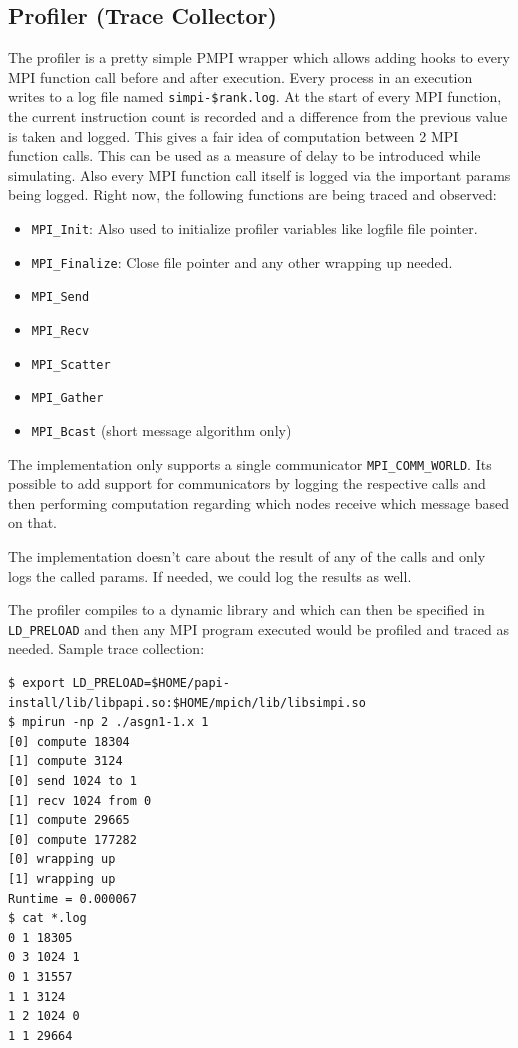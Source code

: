 \documentclass[10pt,conference]{IEEEtran}
\begin{document}
\subsection{Profiler (Trace Collector)}
The profiler is a pretty simple PMPI wrapper which allows adding hooks to every
MPI function call before and after execution. Every process in an execution
writes to a log file named \texttt{simpi-\$rank.log}. At the start of every MPI
function, the current instruction count is recorded and a difference from the
previous value is taken and logged. This gives a fair idea of computation
between 2 MPI function calls. This can be used as a measure of delay to be
introduced while simulating. Also every MPI function call itself is logged via
the important params being logged. Right now, the following functions are being
traced and observed:
\begin{itemize}
  \item \texttt{MPI\_Init}: Also used to initialize profiler variables like
    logfile file pointer.
  \item \texttt{MPI\_Finalize}: Close file pointer and any other wrapping up
    needed.
  \item \texttt{MPI\_Send}
  \item \texttt{MPI\_Recv}
  \item \texttt{MPI\_Scatter}
  \item \texttt{MPI\_Gather}
  \item \texttt{MPI\_Bcast} (short message algorithm only)
\end{itemize}

The implementation only supports a single communicator
\texttt{MPI\_COMM\_WORLD}. Its possible to add support for communicators by
logging the respective calls and then performing computation regarding which
nodes receive which message based on that.

The implementation doesn't care about the result of any of the calls and only
logs the called params. If needed, we could log the results as well.

The profiler compiles to a dynamic library and which can then be specified in
\texttt{LD\_PRELOAD} and then any MPI program executed would be profiled and
traced as needed. Sample trace collection:
\begin{lstlisting}[frame=single]
$ export LD_PRELOAD=$HOME/papi-install/lib/libpapi.so:$HOME/mpich/lib/libsimpi.so
$ mpirun -np 2 ./asgn1-1.x 1
[0] compute 18304
[1] compute 3124
[0] send 1024 to 1
[1] recv 1024 from 0
[1] compute 29665
[0] compute 177282
[0] wrapping up
[1] wrapping up
Runtime = 0.000067
$ cat *.log
0 1 18305
0 3 1024 1
0 1 31557
1 1 3124
1 2 1024 0
1 1 29664
\end{lstlisting}
\end{document}
